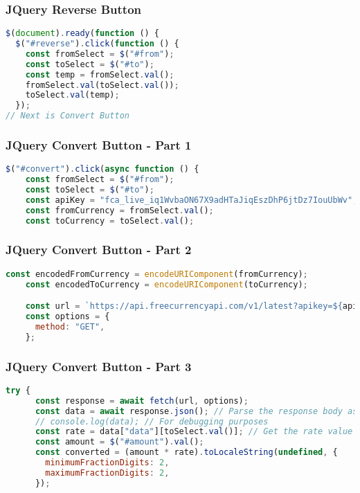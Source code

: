 \documentclass[aspectratio=169, table]{beamer}
\begin{document}
\begin{frame}[fragile]
    \frametitle{JQuery Reverse Button}
    \begin{lstlisting}[language=JavaScript]
$(document).ready(function () {
  $("#reverse").click(function () {
    const fromSelect = $("#from");
    const toSelect = $("#to");
    const temp = fromSelect.val();
    fromSelect.val(toSelect.val());
    toSelect.val(temp);
  });
// Next is Convert Button
    \end{lstlisting}
\end{frame}

\begin{frame}[fragile]
    \frametitle{JQuery Convert Button - Part 1}
    \begin{lstlisting}[language=JavaScript]
  $("#convert").click(async function () {
    const fromSelect = $("#from");
    const toSelect = $("#to");
    const apiKey = "fca_live_iq1WvbaON67X9adHTaJiqEszDhP6jtDz7IouUbWv";
    const fromCurrency = fromSelect.val();
    const toCurrency = toSelect.val();
    \end{lstlisting}
\end{frame}

\begin{frame}[fragile]
    \frametitle{JQuery Convert Button - Part 2}
    \begin{lstlisting}[language=JavaScript]
const encodedFromCurrency = encodeURIComponent(fromCurrency);
    const encodedToCurrency = encodeURIComponent(toCurrency);

    const url = `https://api.freecurrencyapi.com/v1/latest?apikey=${apiKey}&currencies=${encodedToCurrency}&base_currency=${encodedFromCurrency}`;
    const options = {
      method: "GET",
    };
    \end{lstlisting}
\end{frame}

\begin{frame}[fragile]
    \frametitle{JQuery Convert Button - Part 3}
    \begin{lstlisting}[language=JavaScript]
try {
      const response = await fetch(url, options);
      const data = await response.json(); // Parse the response body as JSON
      // console.log(data); // For debugging purposes
      const rate = data["data"][toSelect.val()]; // Get the rate value for the selected currency
      const amount = $("#amount").val();
      const converted = (amount * rate).toLocaleString(undefined, {
        minimumFractionDigits: 2,
        maximumFractionDigits: 2,
      });
    \end{lstlisting}
\end{frame}
\end{document}
